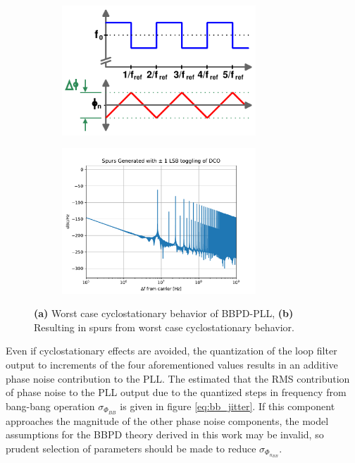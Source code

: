 	\begin{figure}[htb!]
	    \centering
	    \begin{subfigure}{0.5\textwidth}
	        \centering
	        \includegraphics[width=0.8\textwidth, angle=0]{./figs/bbpd_resolution_phase_walk}
	        \caption{ }
	        \label{fig:cylostationary}
	    \end{subfigure}%
	    \begin{subfigure}{0.5\textwidth}
	        \centering
	        \center\includegraphics[width=0.8\textwidth, angle=0]{./figs/spurs_dco}
	        \caption{ }
	        \label{fig:cylostationary_spurs}
	    \end{subfigure}
	    \caption{\textbf{(a)} Worst case cyclostationary behavior of BBPD-PLL, \textbf{(b)} Resulting in spurs from worst case cyclostationary behavior.}
	    \label{fig:cyclostationary_nonsense}
	\end{figure}


	Even if cyclostationary effects are avoided, the quantization of the loop filter output to increments of the four aforementioned values results in an additive phase noise contribution to the PLL. The estimated that the RMS contribution of phase noise to the PLL output due to the quantized steps in frequency from bang-bang operation $\sigma_{\Phi_{BB}}$ is given in figure \ref{eq:bb_jitter}. If this component approaches the magnitude of the other phase noise components, the model assumptions for the BBPD theory derived in this work may be invalid, so prudent selection of parameters should be made to reduce $\sigma_{\Phi_{n_{BB}}}$.

